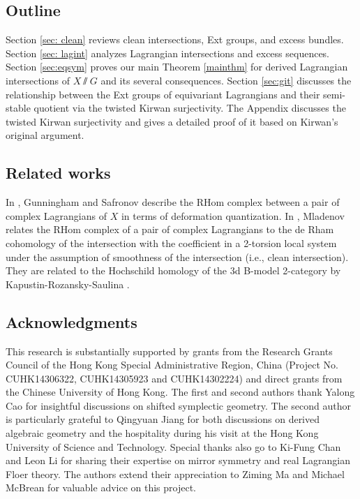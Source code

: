 \documentclass[12pt]{amsart}
\theoremstyle{definition}
\theoremstyle{remark}
\numberwithin{equation}{section}
\begin{document}
\subsection*{Outline} Section \ref{sec: clean} reviews clean intersections, Ext groups, and excess bundles. Section \ref{sec: lagint} analyzes Lagrangian intersections and excess sequences. Section \ref{sec:eqsym} proves our main Theorem \ref{mainthm} for derived Lagrangian intersections of $X\sslash  G$ and its several consequences. Section \ref{sec:git} discusses the relationship between the Ext groups of equivariant Lagrangians and their semi-stable quotient via the twisted Kirwan surjectivity. The Appendix discusses the twisted Kirwan surjectivity and gives a detailed proof of it based on Kirwan's original argument. 

\subsection*{Related works} In \cite{gunningham2023deformation},  Gunningham and Safronov describe the RHom complex between a pair of complex Lagrangians of $X$ in terms of deformation quantization. In \cite{mladenov2024formality}, Mladenov relates the RHom complex of a pair of complex Lagrangians to the de Rham cohomology of the intersection with the coefficient in a 2-torsion local system under the assumption of smoothness of the intersection (i.e., clean intersection). They are related to the Hochschild homology of the 3d B-model 2-category by Kapustin-Rozansky-Saulina \cite{kapustin2009three}. 

\subsection*{Acknowledgments} 
This research is substantially supported by grants from the Research Grants Council of the Hong Kong Special Administrative Region, China (Project No. CUHK14306322, CUHK14305923 and CUHK14302224) and direct grants from the Chinese University of Hong Kong. The first and second authors thank Yalong Cao for insightful discussions on shifted symplectic geometry. The second author is particularly grateful to Qingyuan Jiang for both discussions on derived algebraic geometry and the hospitality during his visit at the Hong Kong University of Science and Technology. Special thanks also go to Ki-Fung Chan and Leon Li for sharing their expertise on mirror symmetry and real Lagrangian Floer theory. The authors extend their appreciation to Ziming Ma and Michael McBrean for valuable advice on this project.
\end{document}
